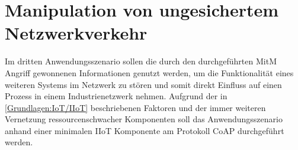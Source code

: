 \section{Manipulation von ungesichertem Netzwerkverkehr}
\label{Anwendungsszenarien:Manipulation von ungesichertem Netzwerkverkehr}
Im dritten Anwendungsszenario sollen die durch den durchgeführten \ac{MitM} Angriff gewonnenen Informationen genutzt werden, um die Funktionalität eines weiteren Systems im Netzwerk zu stören und somit direkt Einfluss auf einen Prozess in einem Industrienetzwerk nehmen. Aufgrund der in \autoref{Grundlagen:IoT/IIoT} beschriebenen Faktoren und der immer weiteren Vernetzung ressourcenschwacher Komponenten soll das Anwendungsszenario anhand einer minimalen \ac{IIoT} Komponente am Protokoll \ac{CoAP} durchgeführt werden.